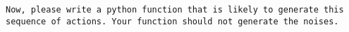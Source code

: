 \documentclass[pdflatex,sn-mathphys-num]{sn-jnl}%
\theoremstyle{thmstyleone}%
\theoremstyle{thmstyletwo}%
\theoremstyle{thmstylethree}%
\begin{document}
\begin{appendices}
\texttt{Now, please write a python function that is likely to generate this sequence of actions. Your function should not generate the noises.}











\end{appendices}


\end{document}
